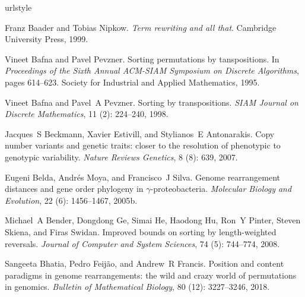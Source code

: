 \documentclass[utf8]{Frontiers_LaTex_Templates/frontiersFPHY} %
\numberwithin{equation}{section}
\begin{document}
\begin{thebibliography}{38}
\providecommand{\natexlab}[1]{#1}
\providecommand{\url}[1]{\texttt{#1}}
\expandafter\ifx\csname urlstyle\endcsname\relax
  \providecommand{\doi}[1]{doi: #1}\else
  \providecommand{\doi}{doi: \begingroup \urlstyle{rm}\Url}\fi

Franz Baader and Tobias Nipkow.
\newblock \emph{Term rewriting and all that}.
\newblock Cambridge University Press, 1999.

Vineet Bafna and Pavel Pevzner.
\newblock Sorting permutations by tanspositions.
\newblock In \emph{Proceedings of the Sixth Annual ACM-SIAM Symposium on
  Discrete Algorithms}, pages 614--623. Society for Industrial and Applied
  Mathematics, 1995.

Vineet Bafna and Pavel~A Pevzner.
\newblock Sorting by transpositions.
\newblock \emph{SIAM Journal on Discrete Mathematics}, 11
  (2): 224--240, 1998.

Jacques~S Beckmann, Xavier Estivill, and Stylianos~E Antonarakis.
\newblock Copy number variants and genetic traits: closer to the resolution of
  phenotypic to genotypic variability.
\newblock \emph{Nature Reviews Genetics}, 8 (8): 639, 2007.

\bibitem[Belda et~al.(2005{\natexlab{b}})]{belda2005genome}
Eugeni Belda, Andr{\'e}s Moya, and Francisco~J Silva.
\newblock Genome rearrangement distances and gene order phylogeny in
  $\gamma$-proteobacteria.
\newblock \emph{Molecular Biology and Evolution}, 22 (6):
  1456--1467, 2005{\natexlab{b}}.

Michael~A Bender, Dongdong Ge, Simai He, Haodong Hu, Ron~Y Pinter, Steven
  Skiena, and Firas Swidan.
\newblock Improved bounds on sorting by length-weighted reversals.
\newblock \emph{Journal of Computer and System Sciences}, 74
  (5): 744--774, 2008.

Sangeeta Bhatia, Pedro Feij{\~a}o, and Andrew~R Francis.
\newblock Position and content paradigms in genome rearrangements: the wild and
  crazy world of permutations in genomics.
\newblock \emph{Bulletin of Mathematical Biology}, 80 (12):
  3227--3246, 2018.


\end{thebibliography}
\end{document}
